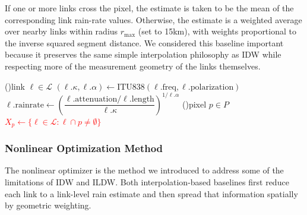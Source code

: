 \documentclass[11pt]{article}
\begin{document}
If one or more links cross the pixel, the estimate is taken to be the mean of the corresponding link rain-rate values. Otherwise, the estimate is a weighted average over nearby links within radius $r_{\max}$ (set to 15km), with weights proportional to the inverse squared segment distance. We considered this baseline important because it preserves the same simple interpolation philosophy as IDW while respecting more of the measurement geometry of the links themselves.
\begin{algorithm}[H]
    \caption{Discretized ILDW. Rainfall is averaged by inverse squared distance to a link. Lines that are different from their corresponding lines in IDW are colored red. }
    \DontPrintSemicolon
\ForEach(){link $\ell \in \mathcal{L}$}{%
    $(\ell.\kappa,\ell.\alpha) \gets \mathrm{ITU838}(\ell.\mathrm{freq},\ell.\mathrm{polarization})$\;
    $\ell.\mathrm{rainrate} \gets \left(\dfrac{\ell.\mathrm{attenuation}/\ell.\mathrm{length}}{\ell.\kappa}\right)^{1/\ell.\alpha}$\;
}
   \ForEach(){pixel $p \in {P}$}{
        \textcolor{red}{$X_p \gets \{\ell \in \mathcal{L} : \ell\cap p \neq \emptyset\}$}\;
    }
\end{algorithm}


\subsubsection{Nonlinear Optimization Method}
The nonlinear optimizer is the method we introduced to address some of the limitations of IDW and ILDW. Both interpolation-based baselines first reduce each link to a link-level rain estimate and then spread that information spatially by geometric weighting. 
\end{document}
